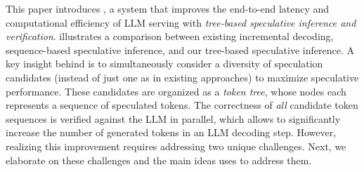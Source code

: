 This paper introduces \sys, a system that improves the end-to-end latency and computational efficiency of LLM serving with {\em tree-based speculative inference and verification}.
 illustrates a comparison between existing incremental decoding, sequence-based speculative inference, and our tree-based speculative inference.
A key insight behind \sys is to simultaneously consider a diversity of speculation candidates (instead of just one as in existing approaches) to maximize speculative performance.
%
These candidates are organized as a {\em token tree}, whose nodes each represents a sequence of speculated tokens.
%
The correctness of {\em all} candidate token sequences is verified against the LLM in parallel, which allows \sys to significantly increase the number of generated tokens in an LLM decoding step. 
%
However, realizing this improvement requires addressing two unique challenges. Next, we elaborate on these challenges and the main ideas \sys uses to address them.

